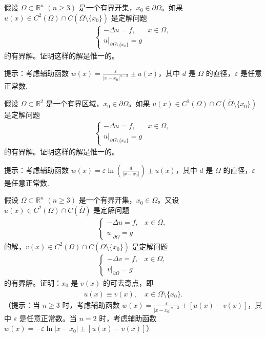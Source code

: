 \documentclass[../../main.tex]{subfiles}%
\begin{document}
\begin{example}
假设 $\Omega\subset\mathbb{R}^n$ $(n\geqslant 3)$ 是一个有界开集，$x_0\in\partial\Omega$。如果 $u(x)\in C^2(\Omega)\cap C(\overline{\Omega}\setminus\{x_0\})$ 是定解问题
\begin{align*}
\begin{cases}
-\Delta u = f, & x\in\Omega, \\
u|_{\partial\Omega\setminus\{x_0\}} = g
\end{cases}
\end{align*}
的有界解。证明这样的解是惟一的。
\end{example}
\begin{note}
提示：考虑辅助函数 $w(x)=\frac{\varepsilon}{|x-x_0|^{n-2}}\pm u(x)$，其中 $d$ 是 $\Omega$ 的直径，$\varepsilon$ 是任意正常数.
\end{note}

\begin{example}
假设 $\Omega\subset\mathbb{R}^2$ 是一个有界区域，$x_0\in\partial\Omega$。如果 $u(x)\in C^2(\Omega)\cap C(\overline{\Omega}\setminus\{x_0\})$ 是定解问题
\begin{align*}
\begin{cases}
-\Delta u = f, & x\in\Omega, \\
u|_{\partial\Omega\setminus\{x_0\}} = g
\end{cases}
\end{align*}
的有界解。证明这样的解是惟一的。
\end{example}
\begin{note}
提示：考虑辅助函数 $w(x)=\varepsilon\ln\left(\frac{d}{|x-x_0|}\right)\pm u(x)$，其中 $d$ 是 $\Omega$ 的直径，$\varepsilon$ 是任意正常数.
\end{note}

\begin{example}
假设 $\Omega\subset\mathbb{R}^n$ $(n\geqslant 3)$ 是一个有界开集，$x_0\in\Omega$。又设 $u(x)\in C^2(\Omega)\cap C(\overline{\Omega})$ 是定解问题
\begin{align*}
\begin{cases}
-\Delta u = f, & x\in\Omega, \\
u|_{\partial\Omega} = g
\end{cases}
\end{align*}
的解，$v(x)\in C^2(\Omega)\cap C(\overline{\Omega}\setminus\{x_0\})$ 是定解问题
\begin{align*}
\begin{cases}
-\Delta v = f, & x\in\Omega, \\
v|_{\partial\Omega} = g
\end{cases}
\end{align*}
的有界解。证明：$x_0$ 是 $v(x)$ 的可去奇点，即
\begin{align*}
u(x)\equiv v(x),\quad x\in\overline{\Omega}\setminus\{x_0\}.
\end{align*}
（提示：当 $n\geqslant 3$ 时，考虑辅助函数 $w(x)=\frac{\varepsilon}{|x-x_0|^{n-2}}\pm [u(x)-v(x)]$，其中 $\varepsilon$ 是任意正常数。当 $n=2$ 时，考虑辅助函数 $w(x)=-\varepsilon\ln|x-x_0|\pm [u(x)-v(x)]$）
\end{example}
\end{document}
